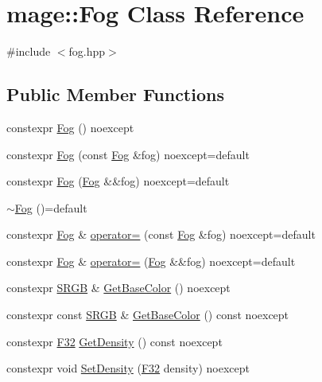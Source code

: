 \hypertarget{classmage_1_1_fog}{}\section{mage\+:\+:Fog Class Reference}
\label{classmage_1_1_fog}


{\ttfamily \#include $<$fog.\+hpp$>$}

\subsection*{Public Member Functions}
\begin{DoxyCompactItemize}
\item 
constexpr \hyperlink{classmage_1_1_fog_ae8108fc4d2fd88a13184ed10fed77603}{Fog} () noexcept
\item 
constexpr \hyperlink{classmage_1_1_fog_acf8d56179a99195dd494c75c05a657e6}{Fog} (const \hyperlink{classmage_1_1_fog}{Fog} \&fog) noexcept=default
\item 
constexpr \hyperlink{classmage_1_1_fog_ac982e1149078f524158c79e36beb4190}{Fog} (\hyperlink{classmage_1_1_fog}{Fog} \&\&fog) noexcept=default
\item 
\hyperlink{classmage_1_1_fog_a46b6b92a6b8a1b219bae756c82843659}{$\sim$\+Fog} ()=default
\item 
constexpr \hyperlink{classmage_1_1_fog}{Fog} \& \hyperlink{classmage_1_1_fog_add9a0a76790ea3e459827e9b04751ce8}{operator=} (const \hyperlink{classmage_1_1_fog}{Fog} \&fog) noexcept=default
\item 
constexpr \hyperlink{classmage_1_1_fog}{Fog} \& \hyperlink{classmage_1_1_fog_a8544e76bc78bc3258b5ce9cf215c2fd1}{operator=} (\hyperlink{classmage_1_1_fog}{Fog} \&\&fog) noexcept=default
\item 
constexpr \hyperlink{structmage_1_1_s_r_g_b}{S\+R\+GB} \& \hyperlink{classmage_1_1_fog_ad6ad839cf0dea51c3871f978bc552364}{Get\+Base\+Color} () noexcept
\item 
constexpr const \hyperlink{structmage_1_1_s_r_g_b}{S\+R\+GB} \& \hyperlink{classmage_1_1_fog_ac91a2ed9ac406110f2bda164fcecafbc}{Get\+Base\+Color} () const noexcept
\item 
constexpr \hyperlink{namespacemage_aa97e833b45f06d60a0a9c4fc22ae02c0}{F32} \hyperlink{classmage_1_1_fog_a6329ce07ae0167746de1aa78011e8285}{Get\+Density} () const noexcept
\item 
constexpr void \hyperlink{classmage_1_1_fog_a51ecd07e2e1ac7ae14ec8855f16aed53}{Set\+Density} (\hyperlink{namespacemage_aa97e833b45f06d60a0a9c4fc22ae02c0}{F32} density) noexcept
\end{DoxyCompactItemize}
